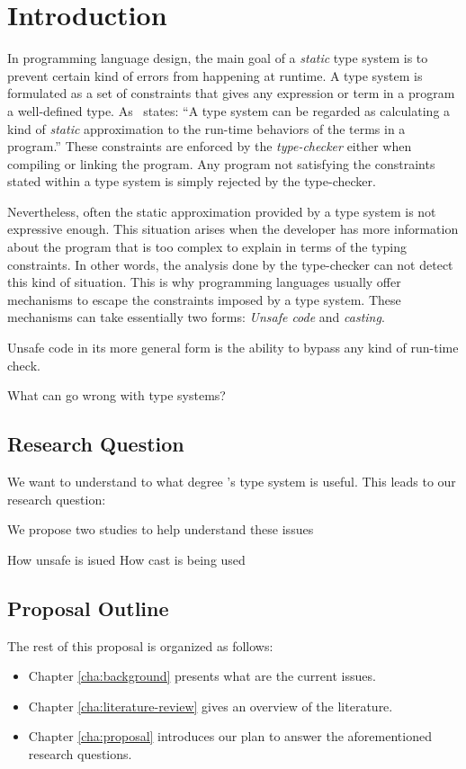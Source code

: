 
\chapter{Introduction}

In programming language design, the main goal of a \emph{static} type system is to prevent certain kind of errors from happening at runtime.
A type system is formulated as a set of constraints that gives any expression or term in a program a well-defined type.
As~\cite{pierceTypesProgrammingLanguages2002} states: ``A type system can be regarded as calculating a kind of \emph{static} approximation to the run-time behaviors of the terms in a program.''
These constraints are enforced by the \emph{type-checker} either when compiling or linking the program.
Any program not satisfying the constraints stated within a type system is simply rejected by the type-checker.

Nevertheless, often the static approximation provided by a type system is not expressive enough.
This situation arises when the developer has more information about the program that is too complex to explain in terms of the typing constraints.
In other words, the analysis done by the type-checker can not detect this kind of situation.
This is why programming languages usually offer mechanisms to escape the constraints imposed by a type system.
These mechanisms can take essentially two forms: \emph{Unsafe code} and \emph{casting}.

Unsafe code in its more general form is the ability to bypass any kind of run-time check.

What can go wrong with type systems?
\section{Research Question}

We want to understand to what degree \java{}'s type system is useful.
This leads to our research question:


We propose two studies to help understand these issues

How unsafe is isued
How cast is being used

\section{Proposal Outline}

The rest of this proposal is organized as follows:

\begin{itemize}
\item Chapter \ref{cha:background} presents what are the current issues.
\item Chapter \ref{cha:literature-review} gives an overview of the literature.
\item Chapter \ref{cha:proposal} introduces our plan to answer the aforementioned research questions.
\end{itemize}
